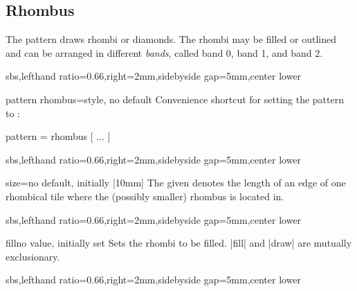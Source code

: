 \documentclass[a4paper,11pt]{article}
\begin{document}
\begin{myvoid}
\subsection{Rhombus}
The  pattern draws rhombi or diamonds. The rhombi may be
filled or outlined and can be arranged in different \emph{bands}, called band 0, band 1, and band 2.

\begin{dispExample*}{sbs,lefthand ratio=0.66,right=2mm,sidebyside gap=5mm,center lower}
\end{dispExample*}


\begin{docTikzKey}{pattern rhombus}{=}{style, no default}
  Convenience shortcut for setting the pattern to :
\begin{dispListing}
  pattern = { rhombus [ ... ] }
\end{dispListing}
\begin{dispExample*}{sbs,lefthand ratio=0.66,right=2mm,sidebyside gap=5mm,center lower}
\end{dispExample*}
\end{docTikzKey}


\begin{docPatternKey}[][doc label=size@rhombus]{size}{=}{no default, initially |10mm|}
  The given  denotes the length of an edge of one rhombical tile
  where the (possibly smaller) rhombus is located in.

\begin{dispExample*}{sbs,lefthand ratio=0.66,right=2mm,sidebyside gap=5mm,center lower}
\end{dispExample*}
\end{docPatternKey}

\clearpage

\begin{docPatternKey}[][doc label=fill@rhombus]{fill}{}{no value, initially set}
  Sets the rhombi to be filled. |fill| and |draw| are mutually exclusionary.
\begin{dispExample*}{sbs,lefthand ratio=0.66,right=2mm,sidebyside gap=5mm,center lower}
\end{dispExample*}
\end{docPatternKey}



\end{myvoid}
\end{document}
